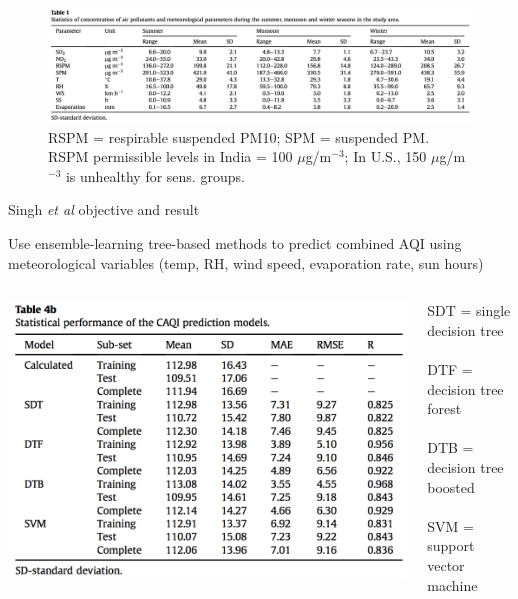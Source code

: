 \documentclass[mathserif, aspectratio=169]{beamer}
\begin{document}
\begin{frame}{}
\begin{figure}
\includegraphics[width=\textwidth]{singh_table1}
\caption*{RSPM = respirable suspended PM10; SPM = suspended PM.  RSPM permissible levels in India = 100 $\mu$g/m$^{-3}$; In U.S., 150 $\mu$g/m$^{-3}$ is unhealthy for sens. groups.}
\end{figure}
\end{frame}

\begin{frame}{Singh \textit{et al} objective and result}

Use ensemble-learning tree-based methods to predict combined AQI using meteorological variables (temp, RH, wind speed, evaporation rate, sun hours)
\begin{columns}

\includegraphics[height=0.75\textheight]{singh_4b}
 

\footnotesize SDT = single decision tree\\~\\
DTF = decision tree forest\\~\\
DTB = decision tree boosted\\~\\
SVM = support vector machine
\end{columns}
\end{frame}
\end{document}
